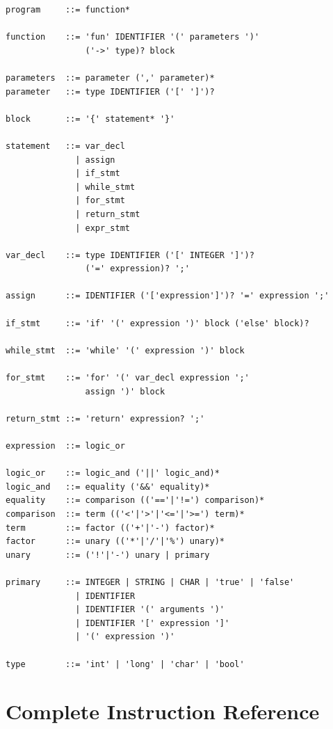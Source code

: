 \documentclass[12pt,a4paper,oneside]{book}
\begin{document}
\begin{verbatim}
program     ::= function*

function    ::= 'fun' IDENTIFIER '(' parameters ')' 
                ('->' type)? block

parameters  ::= parameter (',' parameter)*
parameter   ::= type IDENTIFIER ('[' ']')?

block       ::= '{' statement* '}'

statement   ::= var_decl
              | assign
              | if_stmt
              | while_stmt
              | for_stmt
              | return_stmt
              | expr_stmt

var_decl    ::= type IDENTIFIER ('[' INTEGER ']')? 
                ('=' expression)? ';'

assign      ::= IDENTIFIER ('['expression']')? '=' expression ';'

if_stmt     ::= 'if' '(' expression ')' block ('else' block)?

while_stmt  ::= 'while' '(' expression ')' block

for_stmt    ::= 'for' '(' var_decl expression ';' 
                assign ')' block

return_stmt ::= 'return' expression? ';'

expression  ::= logic_or

logic_or    ::= logic_and ('||' logic_and)*
logic_and   ::= equality ('&&' equality)*
equality    ::= comparison (('=='|'!=') comparison)*
comparison  ::= term (('<'|'>'|'<='|'>=') term)*
term        ::= factor (('+'|'-') factor)*
factor      ::= unary (('*'|'/'|'%') unary)*
unary       ::= ('!'|'-') unary | primary

primary     ::= INTEGER | STRING | CHAR | 'true' | 'false'
              | IDENTIFIER
              | IDENTIFIER '(' arguments ')'
              | IDENTIFIER '[' expression ']'
              | '(' expression ')'

type        ::= 'int' | 'long' | 'char' | 'bool'
\end{verbatim}

\appendix

\chapter{Complete Instruction Reference}
\end{document}

